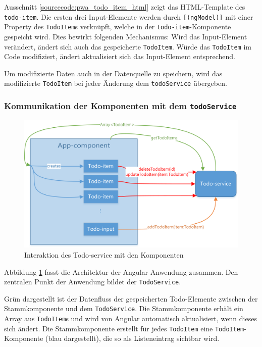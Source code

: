 \begin{description}
	Ausschnitt \ref{sourcecode:pwa_todo_item_html} zeigt das HTML-Template des \texttt{todo-item}. Die ersten drei Input-Elemente werden durch \texttt{[(ngModel)]} mit einer Property des \texttt{TodoItem}s verknüpft, welche in der \texttt{todo-item}-Komponente gespeicht wird. Dies bewirkt folgenden Mechanismus: Wird das Input-Element verändert, ändert sich auch das gespeicherte \texttt{TodoItem}. Würde das \texttt{TodoItem} im Code modifiziert, ändert aktualisiert sich das Input-Element entsprechend.
	
	Um modifizierte Daten auch in der Datenquelle zu speichern, wird das modifizierte \texttt{TodoItem} bei jeder Änderung dem \texttt{todoService} übergeben.
	
	
	
\end{description}

\subsubsection{Kommunikation der Komponenten mit dem \texttt{todoService}}
\begin{figure}[h!]
	\includegraphics[width=\textwidth]{img/pwa_components.png}
	\centering
	\caption{Interaktion des Todo-service mit den Komponenten}
	\label{fig:pwa_todo_service}
\end{figure}

Abbildung \ref{fig:pwa_todo_service} fasst die Architektur der Angular-Anwendung zusammen. Den zentralen Punkt der Anwendung bildet der \texttt{TodoService}. 

Grün dargestellt ist der Datenfluss der gespeicherten Todo-Elemente zwischen der Stammkomponente und dem \texttt{TodoService}. Die Stammkomponente erhält ein Array aus \texttt{TodoItem}s und wird von Angular automatisch aktualisiert, wenn dieses sich ändert.
Die Stammkomponente erstellt für jedes \texttt{TodoItem} eine \texttt{TodoItem}-Komponente (blau dargestellt), die so als Listeneintrag sichtbar wird.

